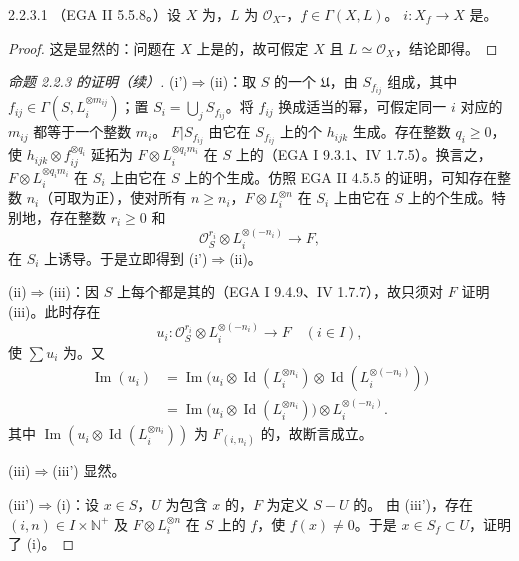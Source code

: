 \begin{SGAresult}{}{2.2.3.1}
（EGA II 5.5.8。）设 $X$ 为，$L$ 为 $\mathcal O_X$-，$f\in\Gamma(X,L)$。 $i:X_f\to X$ 是。
\end{SGAresult}
\begin{proof}
这是显然的：问题在 $X$ 上是的，故可假定 $X$ 且 $L\simeq\mathcal O_X$，结论即得。
\end{proof}
\begin{proof}[命题 2.2.3 的证明（续）]
(i')$\Rightarrow$(ii)：取 $S$ 的一个 $\mathfrak U$，由 $S_{f_{ij}}$ 组成，其中 $f_{ij}\in\Gamma(S,L_i^{\otimes m_{ij}})$；置 $S_i=\bigcup_jS_{f_{ij}}$。将 $f_{ij}$ 换成适当的幂，可假定同一 $i$ 对应的 $m_{ij}$ 都等于一个整数 $m_i$。
 $F|S_{f_{ij}}$ 由它在 $S_{f_{ij}}$ 上的个 $h_{ijk}$ 生成。存在整数 $q_i\geq0$，使 $h_{ijk}\otimes f_{ij}^{\otimes q_i}$ 延拓为 $F\otimes L_i^{\otimes q_im_i}$ 在 $S$ 上的（EGA I 9.3.1、IV 1.7.5）。换言之，$F\otimes L_i^{\otimes q_im_i}$ 在 $S_i$ 上由它在 $S$ 上的个生成。仿照 EGA II 4.5.5 的证明，可知存在整数 $n_i$（可取为正），使对所有 $n\geq n_i$，$F\otimes L_i^{\otimes n}$ 在 $S_i$ 上由它在 $S$ 上的个生成。特别地，存在整数 $r_i\geq0$ 和
\[
\mathcal O_S^{r_i}\otimes L_i^{\otimes(-n_i)}\longrightarrow F,
\]
在 $S_i$ 上诱导。于是立即得到 (i')$\Rightarrow$(ii)。

(ii)$\Rightarrow$(iii)：因 $S$ 上每个都是其的（EGA I 9.4.9、IV 1.7.7），故只须对 $F$ 证明 (iii)。此时存在
\[
u_i:\mathcal O_S^{r_i}\otimes L_i^{\otimes(-n_i)}\longrightarrow F\quad(i\in I),
\]
使 $\sum u_i$ 为。又
\[
\begin{aligned}
\operatorname{Im}(u_i)&=\operatorname{Im}\bigl(u_i\otimes\operatorname{Id}(L_i^{\otimes n_i})\otimes\operatorname{Id}(L_i^{\otimes(-n_i)})\bigr)\\
&=\operatorname{Im}\bigl(u_i\otimes\operatorname{Id}(L_i^{\otimes n_i})\bigr)\otimes L_i^{\otimes(-n_i)}.
\end{aligned}
\]
其中 $\operatorname{Im}(u_i\otimes\operatorname{Id}(L_i^{\otimes n_i}))$ 为 $F_{(i,n_i)}$ 的，故断言成立。

(iii)$\Rightarrow$(iii') 显然。

(iii')$\Rightarrow$(i)：设 $x\in S$，$U$ 为包含 $x$ 的，$F$ 为定义 $S-U$ 的。
由 (iii')，存在 $(i,n)\in I\times\mathbb N^+$ 及 $F\otimes L_i^{\otimes n}$ 在 $S$ 上的 $f$，使 $f(x)\ne0$。于是 $x\in S_f\subset U$，证明了 (i)。
\end{proof}
